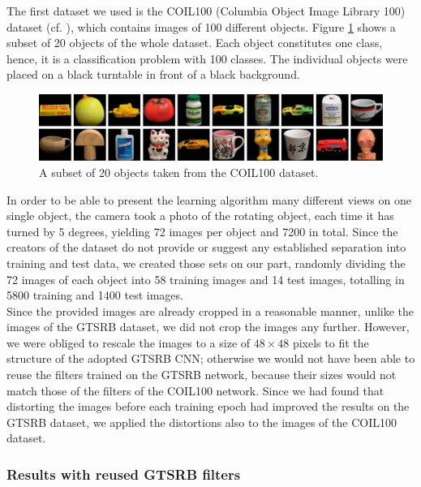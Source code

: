 \documentclass[11pt, a4paper]{article}
\begin{document}
The first dataset we used is the COIL100 (Columbia Object Image Library 100) dataset (cf. \cite{columbia_object_image_library}), which contains images of 100 different objects. Figure \ref{fig:coil100_objects} shows a subset of 20 objects of the whole dataset. Each object constitutes one class, hence, it is a classification problem with 100 classes. The individual objects were placed on a black turntable in front of a black background. 
\begin{figure}[h!]
	\centering
	\includegraphics[width=1\textwidth]{coil100}
	\caption{A subset of 20 objects taken from the COIL100 dataset.}
	\label{fig:coil100_objects}
\end{figure}
In order to be able to present the learning algorithm many different views on one single object, the camera took a photo of the rotating object, each time it has turned by 5 degrees, yielding 72 images per object and 7200 in total. Since the creators of the dataset do not provide or suggest any established separation into training and test data, we created those sets on our part, randomly dividing the 72 images of each object into 58 training images and 14 test images, totalling in 5800 training and 1400 test images.\\
Since the provided images are already cropped in a reasonable manner, unlike the images of the GTSRB dataset, we did not crop the images any further. However, we were obliged to rescale the images to a size of $48 \times 48$ pixels to fit the structure of the adopted GTSRB CNN; otherwise we would not have been able to reuse the filters trained on the GTSRB network, because their sizes would not match those of the filters of the COIL100 network. Since we had found that distorting the images before each training epoch had improved the results on the GTSRB dataset, we applied the distortions also to the images of the COIL100 dataset.

\subsubsection{Results with reused GTSRB filters}
\end{document}
